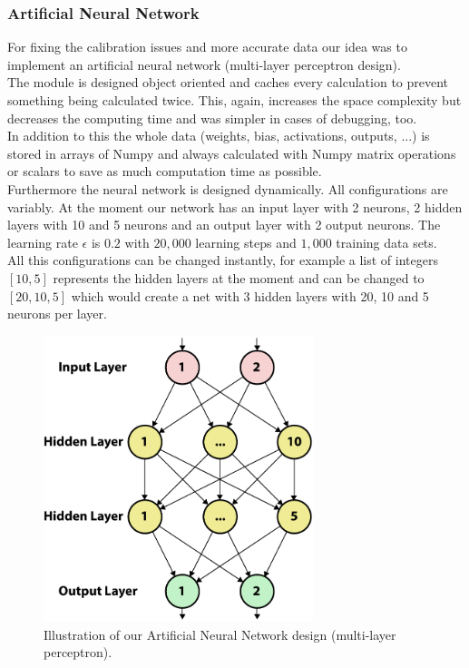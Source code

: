 \documentclass[lnicst,a4paper]{svmultln}
\begin{document}
\subsubsection{Artificial Neural Network}
For fixing the calibration issues and more accurate data our idea was to implement an artificial neural network (multi-layer perceptron design).
\\
The module is designed object oriented and caches every calculation to prevent something being calculated twice. This, again, increases the space complexity but decreases the computing time and was simpler in cases of debugging, too.
\\
In addition to this the whole data (weights, bias, activations, outputs, ...) is stored in arrays of Numpy and always calculated with Numpy matrix operations or scalars to save as much computation time as possible.
\\
Furthermore the neural network is designed dynamically. All configurations are variably. At the moment our network has an input layer with 2 neurons, 2 hidden layers with 10 and 5 neurons and an output layer with 2 output neurons. The learning rate $\epsilon$ is $0.2$ with $20,000$ learning steps and $1,000$ training data sets.
\\
All this configurations can be changed instantly, for example a list of integers $[10, 5]$ represents the hidden layers at the moment and can be changed to $[20, 10, 5]$ which would create a net with 3 hidden layers with 20, 10 and 5 neurons per layer.
\\
\begin{figure}
 	\centerline{\includegraphics[width=0.7\textwidth]{neuralnet1.pdf}}
	{\caption{Illustration of our Artificial Neural Network design (multi-layer perceptron).}\label{fig:ann_illustration1}}
\end{figure}
\end{document}

